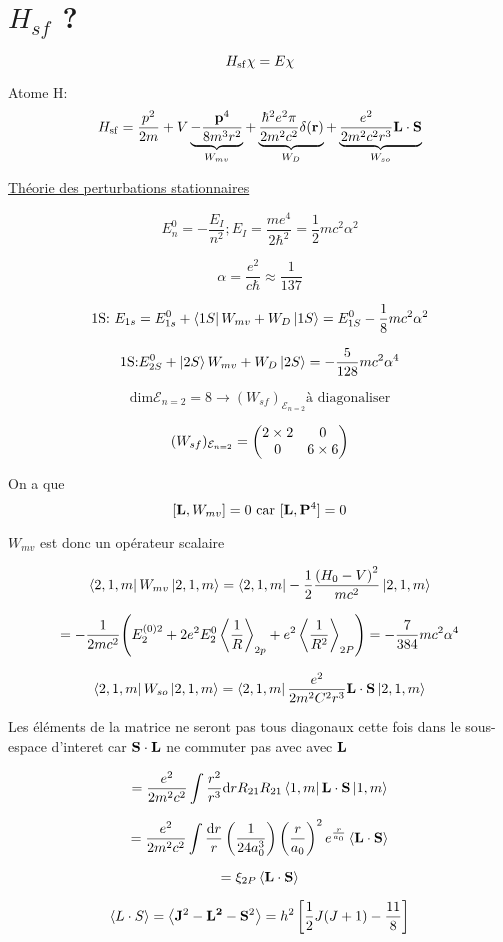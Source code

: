 



\section*{ $H_{sf}$ ? }

$$H_{\rm sf}\chi = E\chi$$ 

Atome H:
$$H_{\rm sf} = \frac{p^2}{2m} + V \underbrace{-\frac{\vb{p}^4}{8m^3r^2}}_{W_{mv} } + \underbrace{\frac{\hbar^2e^2\pi}{2m^2c^2} \delta(\vb r)}_{W_{D} } + \underbrace{\frac{e^2}{2m^2c^2r^3} \vb L \cdot \vb S}_{W_{so} }$$ 


\underline{Théorie des perturbations stationnaires} 

$$E_{n}^0 = -\frac{E_{I}}{n^2}; E_{I} = \frac{me^4}{2\hbar^2} = \frac{1}{2} mc^2 \alpha^2$$ 

$$\alpha = \frac{e^2}{c\hbar} \approx \frac{1}{137} $$ 

$$\text{1S: } E_{1s} = E_{1s}^0 + \bra{1S}W_{mv} + W_{D} \ket{1S} = E_{1S}^0 - \frac{1}{8} mc^2\alpha^2$$ 

$$\text{1S:} E_{2S}^0 + \ket{2S}W_{mv} + W_{D} \ket{2S} = - \frac{5}{128} mc^2\alpha^4$$ 


$$\text{dim} \mathcal{E}_{n=2} = 8 \to (W_{sf} )_{\mathcal{E}_{n=2}} \text{à diagonaliser}$$ 

$$(W_{sf})_{\mathcal{E}_{n=2}} = \begin{pmatrix} 2\times2 & 0 \\ 0 & 6\times6 \end{pmatrix}$$ 


On a que $$[\vb{L}, W_{mv}] =0 \text{ car } [\vb{L}, \vb{P}^4] =0$$ 

$W_{mv}$ est donc un opérateur scalaire


$$\bra{2,1,m} W_{mv} \ket{2,1,m} = \bra{2,1,m} - \frac{1}{2} \frac{\qty(H_0-V)^2}{mc^2} \ket{2,1,m}$$ 


$$= - \frac{1}{2mc^2} \qty(E_{2}^{(0)2}+2 e^2 E_{2}^0 \left\langle \frac{1}{R} \right\rangle_{2p} + e^2 \left\langle \frac{1}{R^2}  \right\rangle_{2P} ) = -\frac{7}{384} mc^2\alpha^4$$ 


$$\bra{2,1,m} W_{so} \ket{2,1,m} = \bra{2,1,m} \frac{e^2}{2m^2C^2r^3} \vb{L}\cdot \vb{S} \ket{2,1,m}$$ 

Les éléments de la matrice ne seront pas tous diagonaux cette fois dans le sous-espace d'interet car $\vb{S}\cdot \vb{L} $ ne commuter pas avec avec $\vb{L}$ 

$$= \frac{e^2}{2m^2c^2} \int \frac{r^2}{r^3} \dd r R_{21} R_{21} \bra{1,m} \vb{L}\cdot \vb{S} \ket{1,m}$$ 

$$= \frac{e^2}{2m^2c^2} \int \frac{\dd r}{r} \left( \frac{1}{24a_{0}^3} \right) \left( \frac{r}{a_{0}}  \right)^2 e^{\frac{r}{a_0} } \left\langle \vb{L}\cdot\vb{S} \right\rangle$$ 

$$= \xi_{2P} \left\langle \vb{L}\cdot \vb{S} \right\rangle$$ 

$$\left\langle L \cdot S \right\rangle = \left\langle \vb{J}^2 -\vb{L^2} -\vb{S}^2 \right\rangle= h^{2}\left[\frac{1}{2} J(J+1)-\frac{11}{8}\right]$$ 






